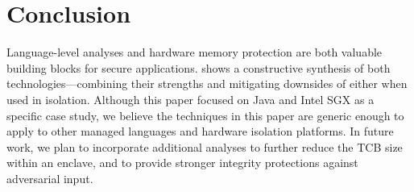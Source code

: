 \section{Conclusion}
\label{sec:conclusion}

Language-level analyses and hardware memory protection are both valuable
building blocks for secure applications.
\sysname{} shows a constructive synthesis of both technologies---combining their strengths
and mitigating downsides of either when used in isolation.
Although this paper focused on Java and Intel SGX as a specific case study,
we believe the techniques in this paper are generic enough to apply to
other managed languages and hardware isolation platforms.
In future work, we plan to incorporate additional analyses
to further reduce the TCB size within an enclave, and to provide
stronger integrity protections against adversarial input.


